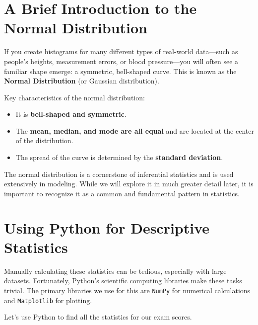 \section{A Brief Introduction to the Normal Distribution}

If you create histograms for many different types of real-world data—such as people's heights, measurement errors, or blood pressure—you will often see a familiar shape emerge: a symmetric, bell-shaped curve. This is known as the \textbf{Normal Distribution} (or Gaussian distribution).


Key characteristics of the normal distribution:
\begin{itemize}
    \item It is \textbf{bell-shaped and symmetric}.
    \item The \textbf{mean, median, and mode are all equal} and are located at the center of the distribution.
    \item The spread of the curve is determined by the \textbf{standard deviation}.
\end{itemize}

The normal distribution is a cornerstone of inferential statistics and is used extensively in modeling. While we will explore it in much greater detail later, it is important to recognize it as a common and fundamental pattern in statistics.

\section{Using Python for Descriptive Statistics}

Manually calculating these statistics can be tedious, especially with large datasets. Fortunately, Python's scientific computing libraries make these tasks trivial. The primary libraries we use for this are \texttt{NumPy} for numerical calculations and \texttt{Matplotlib} for plotting.

Let's use Python to find all the statistics for our exam scores.

